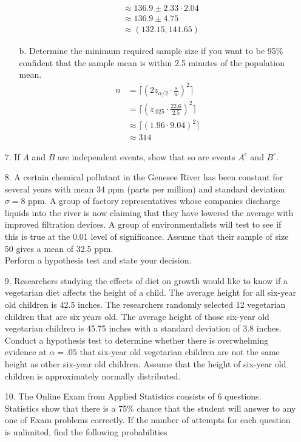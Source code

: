 \documentclass[letterpaper,12pt]{article}
\begin{document}
\begin{enumerate}
\begin{enumerate}
\begin{align*}
          &\approx 136.9 \pm 2.33 \cdot 2.04 \\
          &\approx 136.9 \pm 4.75 \\
          &\approx (132.15, 141.65)
        \end{align*}
      \item[b.]
        Determine the minimum required sample size if you want to be 95\% confident that the sample mean is within 2.5 minutes of the population mean.
        \begin{align*}
          n &= \bigg\lceil \left(2z_{\alpha / 2} \cdot \frac{s}{w}\right)^2 \bigg\rceil \\
          &= \bigg\lceil \left(z_{.025} \cdot \frac{22.6}{2.5}\right)^2 \bigg\rceil \\
          &\approx \big\lceil (1.96 \cdot 9.04)^2 \big\rceil \\
          &\approx 314
        \end{align*}
    \end{enumerate}
  \item[7.]
    If $A$ and $B$ are independent events, show that so are events $A^c$ and $B^c$.
  \item[8.]
    A certain chemical pollutant in the Genesee River has been constant for several years with mean 34 ppm (parts per million) and standard deviation $\sigma = 8$ ppm. A group of factory representatives whose companies discharge liquids into the river is now claiming that they have lowered the average with improved filtration devices. A group of environmentalists will test to see if this is true at the 0.01 level of significance. Assume that their sample of size 50 gives a mean of 32.5 ppm. \\
    Perform a hypothesis test and state your decision.
  \item[9.]
    Researchers studying the effects of diet on growth would like to know if a vegetarian diet affects the height of a child. The average height for all six-year old children is 42.5 inches. The researchers randomly selected 12 vegetarian children that are six years old. The average height of those six-year old vegetarian children is 45.75 inches with a standard deviation of 3.8 inches. Conduct a hypothesis test to determine whether there is overwhelming evidence at $\alpha = .05$ that six-year old vegetarian children are not the same height as other six-year old children. Assume that the height of six-year old children is approximately normally distributed.
  \item[10.]
    The Online Exam from Applied Statistics consists of 6 questions. Statistics show that there is a 75\% chance that the student will answer to any one of Exam problems correctly. If the number of attempts for each question is unlimited, find the following probabilities

\end{enumerate}
\end{document}
